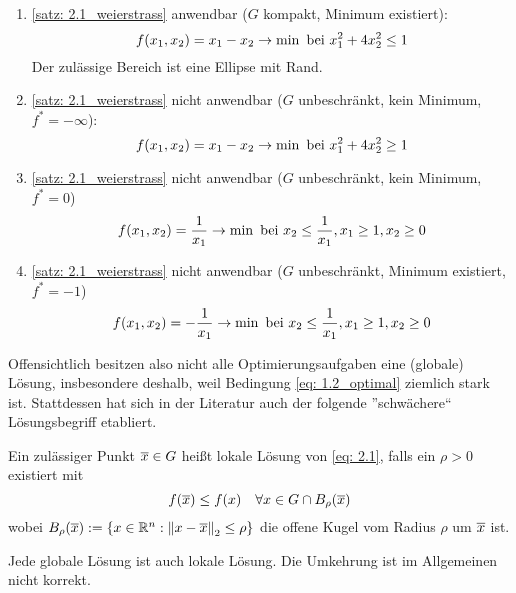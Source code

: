 \begin{beispiel}
	\begin{enumerate}[nolistsep, leftmargin=*, topsep=-\parskip]
		\item \cref{satz: 2.1_weierstrass} anwendbar ($G$ kompakt, Minimum existiert):
		\begin{equation*}
			f(x_1,x_2) = x_1 - x_2 \to \min \text{ bei } x_1^2 + 4x_2^2 \le 1
		\end{equation*}
		Der zulässige Bereich ist eine Ellipse mit Rand.
		\item \cref{satz: 2.1_weierstrass} nicht anwendbar ($G$ unbeschränkt, kein Minimum, $f^\ast = -\infty$):
		\begin{equation*}
			f(x_1,x_2) = x_1 - x_2 \to \min \text{ bei } x_1^2 + 4x_2^2 \ge 1
		\end{equation*}
		\item \cref{satz: 2.1_weierstrass} nicht anwendbar ($G$ unbeschränkt, kein Minimum, $f^\ast = 0$)
		\begin{equation*}
			f(x_1,x_2) = \frac{1}{x_1} \to \min \text{ bei } x_2 \le \frac{1}{x_1}, x_1 \ge 1, x_2 \ge 0
		\end{equation*}
		\item \cref{satz: 2.1_weierstrass} nicht anwendbar ($G$ unbeschränkt, Minimum existiert, $f^\ast = -1$)
		\begin{equation*}
			f(x_1,x_2) = - \frac{1}{x_1} \to \min \text{ bei } x_2 \le \frac{1}{x_1}, x_1 \ge 1, x_2 \ge 0
		\end{equation*}
	\end{enumerate}
\end{beispiel}

Offensichtlich besitzen also nicht alle Optimierungsaufgaben eine (globale) Lösung, insbesondere deshalb, weil Bedingung \eqref{eq: 1.2_optimal} ziemlich stark ist. Stattdessen hat sich in der Literatur auch der folgende ''schwächere`` Lösungsbegriff etabliert.

\begin{definition}
	Ein zulässiger Punkt $\overline{x} \in G$ heißt lokale Lösung von \eqref{eq: 2.1}, falls ein $\rho > 0$ existiert mit 
	\begin{equation*}
		f(\overline{x}) \le f(x) \quad \forall x \in G \cap B_\rho(\overline{x})
	\end{equation*}
	wobei $B_\rho(\overline{x}) \mathrel{:=} \left\{ x \in \mathbb{R}^n : \left\lVert x - \overline{x} \right\rVert_2 \le \rho \right\}$ die offene Kugel vom Radius $\rho$ um $\overline{x}$ ist.
\end{definition}

\begin{bemerkung}
	Jede globale Lösung ist auch lokale Lösung. Die Umkehrung ist im Allgemeinen nicht korrekt.
\end{bemerkung}

